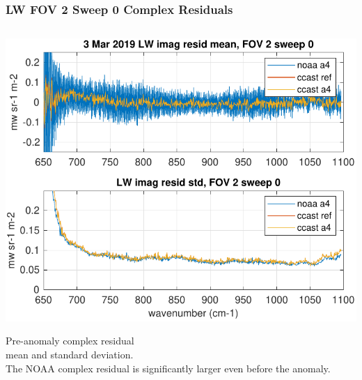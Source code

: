 \documentclass[10pt]{beamer}
\begin{document}
\begin{frame}
\frametitle{LW FOV 2 Sweep 0 Complex Residuals}
\begin{columns}[t]
\begin{column}{0.5\textwidth}
  \begin{centering}
  \includegraphics[width=\textwidth]{figures/LW_MW_good_imag_fov2_sd0.pdf}
  \end{centering}\vspace{3mm}
  Pre-anomaly complex residual \\ mean and standard deviation.  \\The
  NOAA complex residual is significantly larger even before the
  anomaly.
  


\end{column}
\end{columns}
\end{frame}
\end{document}
